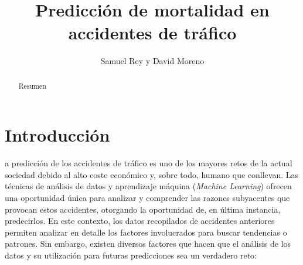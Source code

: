 \documentclass[journal,twoside]{JoPhA}
\begin{document}
\title{Predicción de mortalidad en accidentes de tráfico}
 
\author{Samuel Rey y David Moreno
}


\maketitle


\begin{abstract}
	
Resumen
\end{abstract}


\section{Introducción}
a predicción de los accidentes de tráfico es uno de los mayores retos de la actual sociedad debido al alto coste económico y, sobre todo, humano que conllevan. Las técnicas de análisis de datos y aprendizaje máquina (\textit{Machine Learning}) ofrecen una oportunidad única para analizar y comprender las razones subyacentes que provocan estos accidentes, otorgando la oportunidad de, en última instancia, predecirlos. En este contexto, los datos recopilados de accidentes anteriores permiten analizar en detalle los factores involucrados para buscar tendencias o patrones. Sin embargo, existen diversos factores que hacen que el análisis de los datos y su utilización para futuras predicciones sea un verdadero reto: \\
\end{document}
